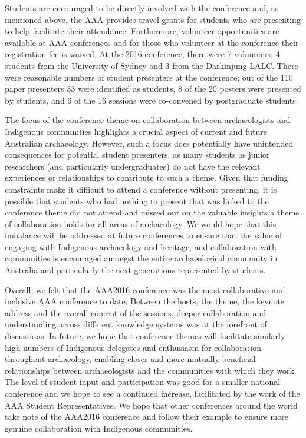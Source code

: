Students are encouraged to be directly involved with the conference and, as mentioned above, the AAA provides travel grants for students who are presenting to help facilitate their attendance. Furthermore, volunteer opportunities are available at AAA conferences and for those who volunteer at the conference their registration fee is waived. At the 2016 conference, there were 7 volunteers; 4 students from the University of Sydney and 3 from the Darkinjung LALC. There were reasonable numbers of student presenters at the conference; out of the 110 paper presenters 33 were identified as students, 8 of the 20 posters were presented by students, and 6 of the 16 sessions were co-convened by postgraduate students.
 
The focus of the conference theme on collaboration between archaeologists and Indigenous communities highlights a crucial aspect of current and future Australian archaeology. However, such a focus does potentially have unintended consequences for potential student presenters, as many students as junior researchers (and particularly undergraduates) do not have the relevant experiences or relationships to contribute to such a theme. Given that funding constraints make it difficult to attend a conference without presenting, it is possible that students who had nothing to present that was linked to the conference theme did not attend and missed out on the valuable insights a theme of collaboration holds for all areas of archaeology. We would hope that this imbalance will be addressed at future conferences to ensure that the value of engaging with Indigenous archaeology and heritage, and collaboration with communities is encouraged amongst the entire archaeological community in Australia and particularly the next generations represented by students.



Overall, we felt that the AAA2016 conference was the most collaborative and inclusive AAA conference to date. Between the hosts, the theme, the keynote address and the overall content of the sessions, deeper collaboration and understanding across different knowledge systems was at the forefront of discussions. In future, we hope that conference themes will facilitate similarly high numbers of Indigenous delegates and enthusiasm for collaboration throughout archaeology, enabling closer and more mutually beneficial relationships between archaeologists and the communities with which they work. The level of student input and participation was good for a smaller national conference and we hope to see a continued increase, facilitated by the work of the AAA Student Representatives. We hope that other conferences around the world take note of the AAA2016 conference and follow their example to ensure more genuine collaboration with Indigenous communities.

\IJSRAclosing